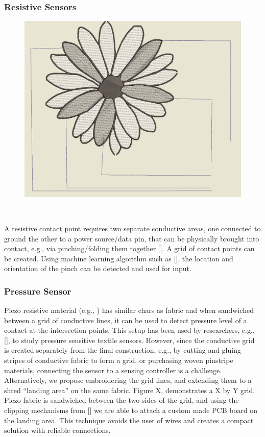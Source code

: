 \subsubsection{Resistive Sensors} 
\begin{figure}
\centering
  \includegraphics[width=0.9\columnwidth]{figures/FlowerSensor}
  \caption{}~\label{fig:FlowerSensor}
  \vspace{-2.5em}
\end{figure}
A resistive contact point requires two separate conductive areas, one connected to ground the other to a power source/data pin, that can be physically brought into contact, e.g., via pinching/folding them together []. A grid of contact points can be created. Using machine learning algorithm such as [], the location and orientation of the pinch can be detected and used for input.

\subsubsection{Pressure Sensor} 
Piezo resistive material (e.g., ) has similar chars as fabric and when sandwiched between a grid of conductive lines, it can be used to detect pressure level of a contact at the intersection points. This setup has been used by researchers, e.g., [], to study pressure sensitive textile sensors. However, since the conductive grid is created separately from the final construction, e.g., by cutting and gluing stripes of conductive fabric to form a grid, or purchasing woven pinstripe materials, connecting the sensor to a sensing controller is a challenge. Alternatively, we propose embroidering the grid lines, and extending them to a shred ``landing area'' on the same fabric. Figure X, demonstrates a X by Y grid. Piezo fabric is sandwiched between the two sides of the grid, and using the clipping mechanisms from [] we are able to attach a custom made PCB board on the landing area. This technique avoids the user of wires and creates a compact solution with reliable connections.  

